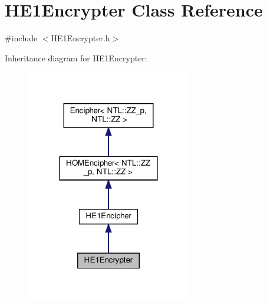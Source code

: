 \hypertarget{classHE1Encrypter}{}\section{H\+E1\+Encrypter Class Reference}
\label{classHE1Encrypter}


{\ttfamily \#include $<$H\+E1\+Encrypter.\+h$>$}



Inheritance diagram for H\+E1\+Encrypter\+:
\nopagebreak
\begin{figure}[H]
\begin{center}
\leavevmode
\includegraphics[width=204pt]{classHE1Encrypter__inherit__graph}
\end{center}
\end{figure}


